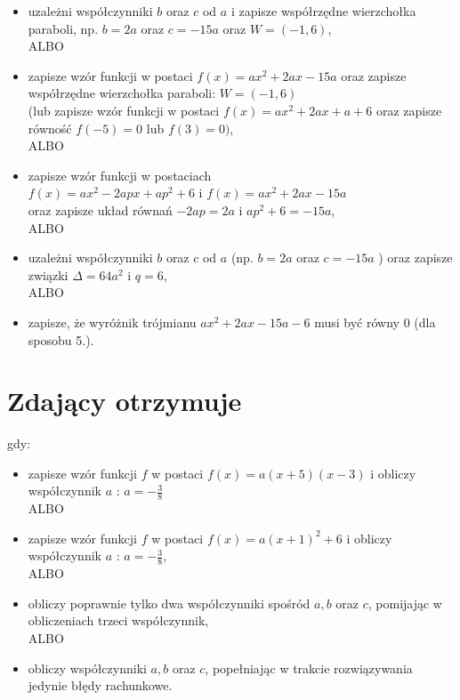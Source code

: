\documentclass[10pt]{article}
\begin{document}
\begin{itemize}
  \item uzależni współczynniki $b$ oraz $c$ od $a$ i zapisze współrzędne wierzchołka paraboli, np. $b=2 a$ oraz $c=-15 a$ oraz $W=(-1,6)$,\\
ALBO
  \item zapisze wzór funkcji w postaci $f(x)=a x^{2}+2 a x-15 a$ oraz zapisze współrzędne wierzchołka paraboli: $W=(-1,6)$\\
(lub zapisze wzór funkcji w postaci $f(x)=a x^{2}+2 a x+a+6$ oraz zapisze równość $f(-5)=0$ lub $f(3)=0)$,\\
ALBO
  \item zapisze wzór funkcji w postaciach\\
$f(x)=a x^{2}-2 a p x+a p^{2}+6$ i $f(x)=a x^{2}+2 a x-15 a$\\
oraz zapisze układ równań $-2 a p=2 a$ i $a p^{2}+6=-15 a$,\\
ALBO
  \item uzależni współczynniki $b$ oraz $c$ od $a$ (np. $b=2 a$ oraz $c=-15 a$ ) oraz zapisze związki $\Delta=64 a^{2}$ i $q=6$,\\
ALBO
  \item zapisze, że wyróżnik trójmianu $a x^{2}+2 a x-15 a-6$ musi być równy 0 (dla sposobu 5.).
\end{itemize}

\section*{Zdający otrzymuje}
gdy:

\begin{itemize}
  \item zapisze wzór funkcji $f$ w postaci $f(x)=a(x+5)(x-3)$ i obliczy\\
współczynnik $a$ : $a=-\frac{3}{8}$\\
ALBO
  \item zapisze wzór funkcji $f$ w postaci $f(x)=a(x+1)^{2}+6$ i obliczy współczynnik $a$ : $a=-\frac{3}{8}$,\\
ALBO
  \item obliczy poprawnie tylko dwa współczynniki spośród $a, b$ oraz $c$, pomijając w obliczeniach trzeci współczynnik,\\
ALBO
  \item obliczy współczynniki $a, b$ oraz $c$, popełniając w trakcie rozwiązywania jedynie błędy rachunkowe.
\end{itemize}
\end{document}
